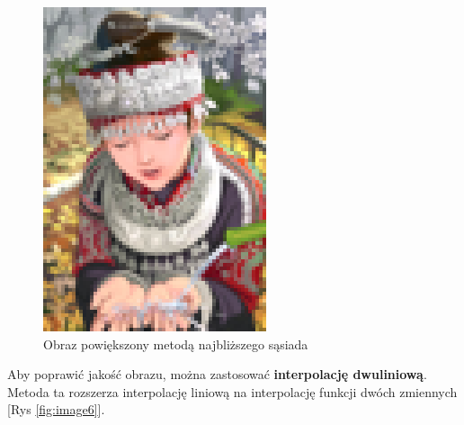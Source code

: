 \begin{figure}[ht]
\begin{minipage}[t]{0.32\linewidth}
        \includegraphics[width=\linewidth]{Rozdziały/02.Podstawy_teoretyczne/Obrazy/comic_NN_x4.png}
        \caption{Obraz powiększony metodą najbliższego sąsiada}
        \label{fig:image5}
    \end{minipage}
  \end{figure}


Aby poprawić jakość obrazu, można zastosować \textbf{interpolację dwuliniową}. Metoda ta rozszerza interpolację liniową na interpolację funkcji dwóch zmiennych [Rys \ref{fig:image6}]. 

